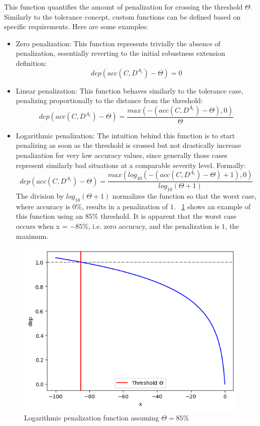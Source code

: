 This function quantifies the amount of penalization for crossing the threshold $\Theta$. Similarly to the tolerance concept, custom functions can be defined based on specific requirements. Here are some examples:
\begin{itemize}
	\item Zero penalization: This function represents trivially the absence of penalization, essentially reverting to the initial robustness extension definition:
	\[
		dep(acc(C,D^{A_i}) - \Theta) = 0
	\]
	
	\item Linear penalization: This function behaves similarly to the tolerance case, penalizing proportionally to the distance from the threshold:
	\[
		dep(acc(C,D^{A_i}) - \Theta) = \frac{max(-(acc(C,D^{A_i}) - \Theta), 0)}{\Theta}
	\]
	\item Logarithmic penalization: The intuition behind this function is to start penalizing as soon as the threshold is crossed but not drastically increase penalization for very low accuracy values, since generally those cases represent similarly bad situations at a comparable severity level. Formally:
	\[
		dep(acc(C,D^{A_i}) - \Theta) = \frac{max(log_{10}(-(acc(C,D^{A_i}) - \Theta) + 1),0)}{log_{10}(\Theta + 1)}
	\]
	The division by $log_{10}(\Theta + 1)$ normalizes the function so that the worst case, where accuracy is $0\%$, results in a penalization of $1$.
	\Fig~\ref{fig:log_penalization} shows an example of this function using an $85\%$ threshold. It is apparent that the worst case occurs when x = $-85\%$, i.e. zero accuracy, and the penalization is $1$, the maximum.
\end{itemize}

\begin{figure}[h]
	\centering
	\includegraphics[width=0.7\linewidth]{ImageFiles/ANNRob/log_penalization}
	\caption{Logarithmic penalization function assuming $\Theta=85\%$}
	\label{fig:log_penalization}
\end{figure}

